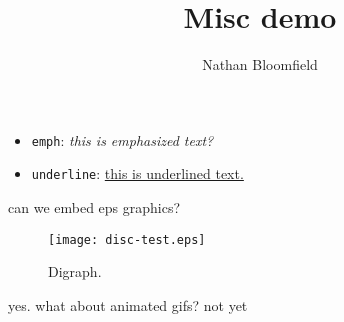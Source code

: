 \documentclass{ximera}
\title{Misc demo}
\author{Nathan Bloomfield}
\begin{document}
\maketitle

\begin{itemize}
\item \texttt{emph}: \emph{this is emphasized text?}
\item \texttt{underline}: \underline{this is underlined text.}
\end{itemize}

can we embed eps graphics?

\begin{figure}[!htb]
\begin{center}
\texttt{[image: disc-test.eps]}
\caption{Digraph.}
\end{center}
\label{fig:digraph}
\end{figure}

yes. what about animated gifs?
not yet
\end{document}
